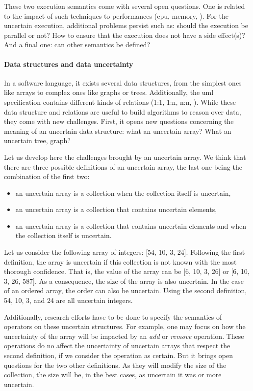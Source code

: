 These two execution semantics come with several open questions.
One is related to the impact of such techniques to performances (\gls{cpu}, memory, \etc).
For the uncertain execution, additional problems persist such as: should the execution be parallel or not? How to ensure that the execution does not have a side effect(s)?
And a final one: can other semantics be defined?

\paragraph{Data structures and data uncertainty}
In a software language, it exists several data structures, from the simplest ones like arrays to complex ones like graphs or trees.
Additionally, the \gls{uml} specification contains different kinds of relations (1:1, 1:n, n:n, \etc).
While these data structure and relations are useful to build algorithms to reason over data, they come with new challenges.
First, it opens new questions concerning the meaning of an uncertain data structure: what an uncertain array? What an uncertain tree, graph?

Let us develop here the challenges brought by an uncertain array.
We think that there are three possible definitions of an uncertain array, the last one being the combination of the first two:
\begin{itemize}
	\item an uncertain array is a collection when the collection itself is uncertain,
	\item an uncertain array is a collection that contains uncertain elements,
	\item an uncertain array is a collection that contains uncertain elements and when the collection itself is uncertain.
\end{itemize}
Let us consider the following array of integers: [54, 10, 3, 24]. 
Following the first definition, the array is uncertain if this collection is not known with the most thorough confidence.
That is, the value of the array can be [6, 10, 3, 26] or [6, 10, 3, 26, 587].
As a consequence, the size of the array is also uncertain.
In the case of an ordered array, the order can also be uncertain.
Using the second definition, 54, 10, 3, and 24 are all uncertain integers.

Additionally, research efforts have to be done to specify the semantics of operators on these uncertain structures.
For example, one may focus on how the uncertainty of the array will be impacted by an \textit{add} or \textit{remove} operation.
These operations do no affect the uncertainty of uncertain arrays that respect the second definition, if we consider the operation as certain.
But it brings open questions for the two other definitions.
As they will modify the size of the collection, the size will be, in the best cases, as uncertain it was or more uncertain.

